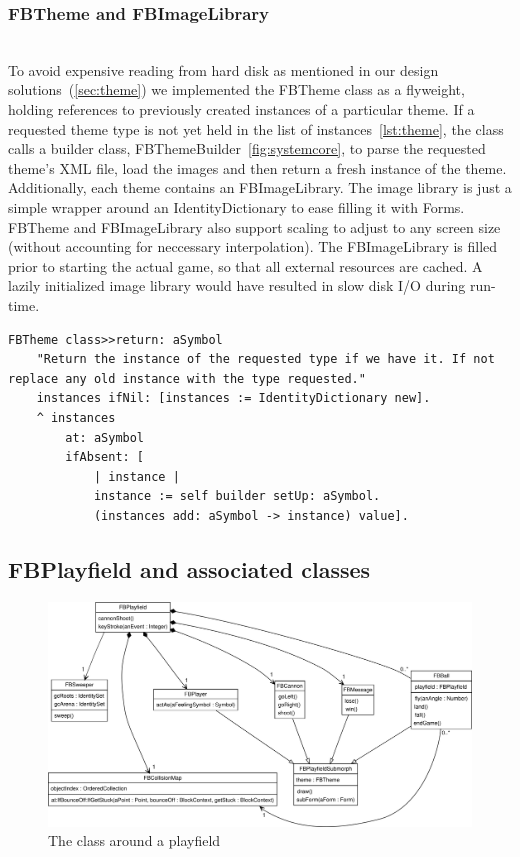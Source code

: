 \subsubsection{FBTheme and FBImageLibrary}~\\ 
To avoid expensive reading from hard disk as mentioned in our design solutions~(\ref{sec:theme})
we implemented the FBTheme class as a flyweight, holding references to previously 
created instances of a particular theme. If a requested theme type is not yet 
held in the list of instances~\ref{lst:theme}, the class calls a builder class, 
FBThemeBuilder~\ref{fig:systemcore}, to parse the requested theme's XML file, 
load the images and then return a fresh instance of the theme. Additionally, 
each theme contains an FBImageLibrary. The image library is just a simple 
wrapper around an IdentityDictionary to ease filling it with Forms. 
FBTheme and FBImageLibrary also support scaling to adjust to any screen 
size (without accounting for neccessary interpolation).
The FBImageLibrary is filled prior to starting the actual game, so 
that all external resources are cached. A lazily initialized image 
library would have resulted in slow disk I/O during
run-time.
%
\begin{lstlisting}[language=Smalltalk, label=lst:theme, caption= FBTheme "return:" method, float]
FBTheme class>>return: aSymbol
    "Return the instance of the requested type if we have it. If not replace any old instance with the type requested."
    instances ifNil: [instances := IdentityDictionary new].
    ^ instances 
        at: aSymbol 
        ifAbsent: [
            | instance |
            instance := self builder setUp: aSymbol.
            (instances add: aSymbol -> instance) value].
\end{lstlisting}
%
\subsection{FBPlayfield and associated classes}
%
\begin{figure}[bt]
  \begin{center}
    \includegraphics[width=\linewidth]{images/systemplay.png}
  \end{center}
  \caption{The class around a playfield}
  \label{fig:systemplay}
\end{figure}
%

